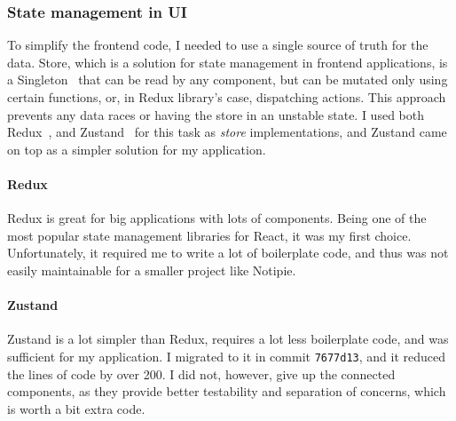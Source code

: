 \subsubsection{State management in UI}\label{sec:state-management-in-ui}

To simplify the frontend code,
I needed to use a single source of truth for the data.
Store,
which is a solution for state management
in frontend applications,
is a Singleton~\cite{gamma_design_1994}
that can be read by any component,
but can be mutated only using certain functions,
or, in Redux library's case, dispatching actions.
This approach prevents any data races
or having the store in an unstable state.
I used both Redux~\cite{gaeraon_redux_2022},
and Zustand~\cite{kato_zustand_2022} for this task
as \textit{store} implementations,
and Zustand came on top as a simpler solution for my application.

\paragraph*{Redux}\label{sec:redux}

Redux is great for big applications with lots of components.
Being one of the most popular state management libraries for React,
it was my first choice.
Unfortunately,
it required me to write a lot of boilerplate code,
and thus was not easily maintainable
for a smaller project like Notipie.

\paragraph*{Zustand}\label{sec:zustand}

Zustand is a lot simpler than Redux,
requires a lot less boilerplate code,
and was sufficient for my application.
I migrated to it in commit
\texttt{7677d13},
and it reduced the lines of code by over 200.
I did not, however, give up the connected components,
as they provide better testability and separation of concerns,
which is worth a bit extra code.

